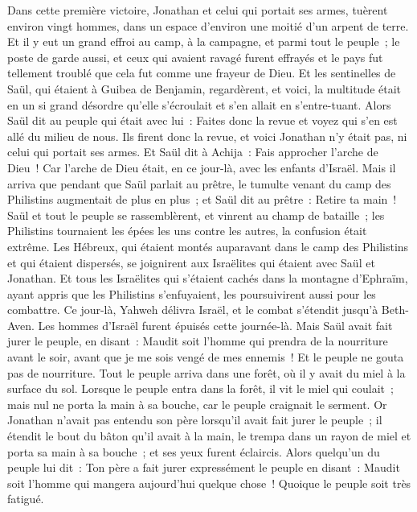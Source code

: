 \begin{multicols}{2}
Dans cette première victoire, Jonathan et celui qui portait ses armes, tuèrent environ vingt hommes, dans un espace d'environ une moitié d'un arpent de terre.
Et il y eut un grand effroi au camp, à la campagne, et parmi tout le peuple~; le poste de garde aussi, et ceux qui avaient ravagé furent effrayés et le pays fut tellement troublé que cela fut comme une frayeur de Dieu.
Et les sentinelles de Saül, qui étaient à Guibea de Benjamin, regardèrent, et voici, la multitude était en un si grand désordre qu'elle s'écroulait et s'en allait en s'entre-tuant.
Alors Saül dit au peuple qui était avec lui~: Faites donc la revue et voyez qui s'en est allé du milieu de nous. Ils firent donc la revue, et voici Jonathan n'y était pas, ni celui qui portait ses armes.
Et Saül dit à Achija~: Fais approcher l'arche de Dieu~! Car l'arche de Dieu était, en ce jour-là, avec les enfants d'Israël.
Mais il arriva que pendant que Saül parlait au prêtre, le tumulte venant du camp des Philistins augmentait de plus en plus~; et Saül dit au prêtre~: Retire ta main~!
Saül et tout le peuple se rassemblèrent, et vinrent au champ de bataille~; les Philistins tournaient les épées les uns contre les autres, la confusion était extrême.
Les Hébreux, qui étaient montés auparavant dans le camp des Philistins et qui étaient dispersés, se joignirent aux Israëlites qui étaient avec Saül et Jonathan.
Et tous les Israëlites qui s'étaient cachés dans la montagne d'Ephraïm, ayant appris que les Philistins s'enfuyaient, les poursuivirent aussi pour les combattre.
Ce jour-là, Yahweh délivra Israël, et le combat s'étendit jusqu'à Beth-Aven.
Les hommes d'Israël furent épuisés cette journée-là. Mais Saül avait fait jurer le peuple, en disant~: Maudit soit l'homme qui prendra de la nourriture avant le soir, avant que je me sois vengé de mes ennemis~! Et le peuple ne gouta pas de nourriture.
Tout le peuple arriva dans une forêt, où il y avait du miel à la surface du sol.
Lorsque le peuple entra dans la forêt, il vit le miel qui coulait~; mais nul ne porta la main à sa bouche, car le peuple craignait le serment.
Or Jonathan n'avait pas entendu son père lorsqu'il avait fait jurer le peuple~; il étendit le bout du bâton qu'il avait à la main, le trempa dans un rayon de miel et porta sa main à sa bouche~; et ses yeux furent éclaircis.
Alors quelqu'un du peuple lui dit~: Ton père a fait jurer expressément le peuple en disant~: Maudit soit l'homme qui mangera aujourd'hui quelque chose~! Quoique le peuple soit très fatigué.

\end{multicols}
